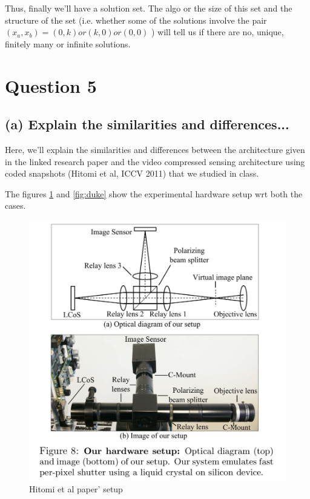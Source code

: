 \documentclass[fleqn, 11pt]{article}
\begin{document}
 Thus, finally we'll have a solution set. The algo or 
 the size of this set 
 and the structure of the set (i.e. whether some of the solutions
 involve the pair $(x_a, x_b)=(0,k) or (k,0) or (0,0)$ )
 will tell us
 if there are no, unique, finitely many or infinite solutions. 
 



\newpage
\section*{Question 5}
\setcounter{equation}{0}

\subsection*{(a) Explain the similarities and differences... }

Here, we'll explain the similarities and differences between the architecture given in the 
linked research paper and the video compressed sensing
architecture using coded snapshots (Hitomi et al, ICCV 2011) that we studied in class.


The figures \ref{fig:hitomi} and \ref{fig:duke}  show the experimental hardware setup wrt 
both the cases.

        
\begin{figure}[h!]
        \includegraphics[scale=0.3]{hitomi.png}
        \caption{Hitomi et al paper' setup}
        \label{fig:hitomi}
\end{figure}
\end{document}
